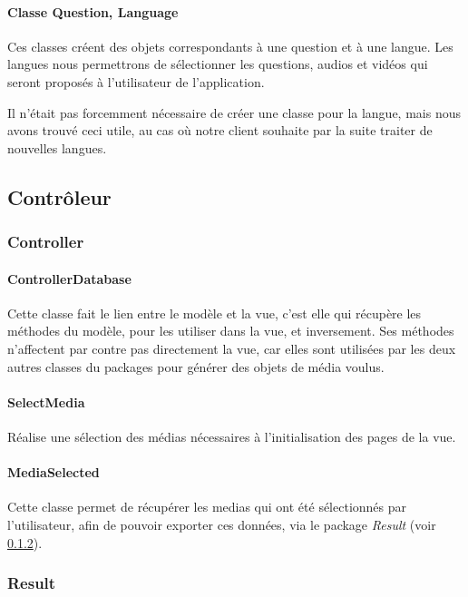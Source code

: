 \paragraph{Classe Question, Language}

Ces classes créent des objets correspondants à une question et à une langue. Les langues nous permettrons de sélectionner les questions, audios et vidéos qui seront proposés à l'utilisateur de l'application.

Il n'était pas forcemment nécessaire de créer une classe pour la langue, mais nous avons trouvé ceci utile, au cas où notre client souhaite par la suite traiter de nouvelles langues.


\subsection{Contrôleur}


\subsubsection{Controller}

\paragraph{ControllerDatabase}

Cette classe fait le lien entre le modèle et la vue, c'est elle qui récupère les méthodes du modèle, pour les utiliser dans la vue, et inversement. Ses méthodes n'affectent par contre pas directement la vue, car elles sont utilisées par les deux autres classes du packages pour générer des objets de média voulus.

\paragraph{SelectMedia}

Réalise une sélection des médias nécessaires à l'initialisation des pages de la vue.

\paragraph{MediaSelected}

Cette classe permet de récupérer les medias qui ont été sélectionnés par l'utilisateur, afin de pouvoir exporter ces données, via le package \textit{Result} (voir \ref{Archi_Results}).


\subsubsection{Result}\label{Archi_Results}

